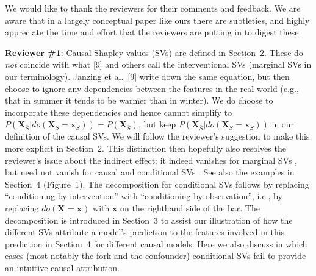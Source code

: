\documentclass{article}
\newcommand{\vX}{\mathbf{X}}
\newcommand{\vx}{\mathbf{x}}
\newcommand{\expectation}{\mathbb{E}}
\newcommand{\contribution}{{\phi}}
\newcommand{\dodo}{\mathit{do}}
\newcommand{\lvdo}[1]{\dodo(\vX_{#1} = \vx_{#1})}
\newcommand{\perm}{\pi}
\newcommand{\isequal}{\hspace*{-2.5mm} & = & \hspace*{-2.5mm}}
\newcommand{\Spre}{\underline{S}}
\newcommand{\Spost}{\bar{S}}
\begin{document}
We would like to thank the reviewers for their comments and feedback. We are aware that in a largely conceptual paper like ours there are subtleties, and highly appreciate the time and effort that the reviewers are putting in to digest these.

{\bf Reviewer \#1}: Causal Shapley values (SVs) are defined in Section~2.
These do {\em not} coincide with what [9] and others call the interventional SVs (marginal SVs in our terminology). Janzing et al.~[9] write down the same equation, but then choose to ignore any dependencies between the features in the real world (e.g., that in summer it tends to be warmer than in winter).
We do choose to incorporate these dependencies and hence cannot simplify to $P(\vX_{\bar{S}}|\lvdo{S}) = P(\vX_{\bar{S}})$, but keep $P(\vX_{\bar{S}}|\lvdo{S})$ in our definition of the causal SVs. We will follow the reviewer's suggestion to make this more explicit in Section~2. This distinction then hopefully also resolves the reviewer's issue about the indirect effect: it indeed vanishes for marginal SVs%
, but need not vanish for causal and conditional SVs%
. See also the examples in Section~4 (Figure~1). The decomposition for conditional SVs follows by replacing ``conditioning by intervention'' with ``conditioning by observation'', i.e., by replacing $\lvdo{}$ with $\vx$ on the righthand side of the bar.
The decomposition is introduced in Section~3 to assist our illustration of how the different SVs attribute a model's prediction to the features involved in this prediction in Section~4 for different causal models. Here we also discuss in which cases (most notably the fork and the confounder) conditional SVs fail to provide an intuitive causal attribution.
\end{document}
